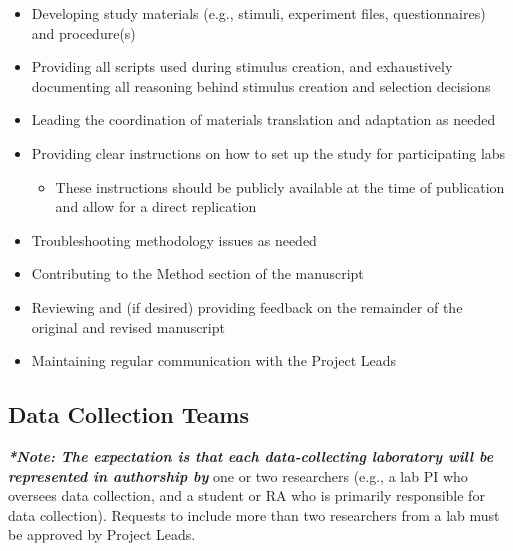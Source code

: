 \documentclass[
  letterpaper,
  DIV=11,
  numbers=noendperiod,
  oneside]{scrreprt}
\providecommand{\tightlist}{%
  \setlength{\itemsep}{0pt}\setlength{\parskip}{0pt}}
\begin{document}
\begin{itemize}
\tightlist
\item
  Developing study materials (e.g., stimuli, experiment files,
  questionnaires) and procedure(s)
\item
  Providing all scripts used during stimulus creation, and exhaustively
  documenting all reasoning behind stimulus creation and selection
  decisions
\item
  Leading the coordination of materials translation and adaptation as
  needed
\item
  Providing clear instructions on how to set up the study for
  participating labs

  \begin{itemize}
  \tightlist
  \item
    These instructions should be publicly available at the time of
    publication and allow for a direct replication
  \end{itemize}
\item
  Troubleshooting methodology issues as needed
\item
  Contributing to the Method section of the manuscript
\item
  Reviewing and (if desired) providing feedback on the remainder of the
  original and revised manuscript
\item
  Maintaining regular communication with the Project Leads
\end{itemize}

\subsection{Data Collection Teams}\label{data-collection-teams}

\textbf{\emph{*Note: The expectation is that each data-collecting
laboratory will be represented in authorship by}} one or two researchers
(e.g., a lab PI who oversees data collection, and a student or RA who is
primarily responsible for data collection). Requests to include more
than two researchers from a lab must be approved by Project Leads.
\end{document}
